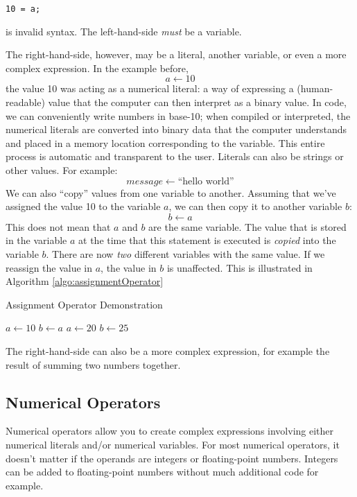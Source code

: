\texttt{10 = a;}

is invalid syntax.  The left-hand-side \emph{must} be a variable.

The right-hand-side, however, may be a \gls{literal}, another variable, or 
even a more complex \gls{expression}.  In the example before, 
  $$a \leftarrow 10$$
the value 10 was acting as a numerical literal: a way of expressing a (human-readable) 
value that the computer can then interpret as a binary value.  In code, we
can conveniently write numbers in base-10; when compiled or interpreted, 
the numerical literals are converted into binary data that the computer
understands and placed in a memory location corresponding to the variable.
This entire process is automatic and transparent to the user.
Literals can also be strings or other values.  For example:
  $$message \leftarrow \text{``hello world''}$$
We can also ``copy'' values from one variable to another.  Assuming that we've assigned
the value 10 to the variable $a$, we can then copy it to another variable $b$: 
  $$b \leftarrow a$$
This does not mean that $a$ and $b$ are the same variable.  The value that is stored
in the variable $a$ at the time that this statement is executed is \emph{copied} into 
the variable $b$.  There are now \emph{two} different variables with the same value.
If we reassign the value in $a$, the value in $b$ is unaffected.  This is illustrated in
Algorithm \ref{algo:assignmentOperator}

\begin{algorithm}[H]
\caption{Assignment Operator Demonstration}
\label{algo:assignmentOperator}
$a \leftarrow 10$ \;
$b \leftarrow a$ \;
$a \leftarrow 20$ \;
$b \leftarrow 25$ \;
\end{algorithm}

The right-hand-side can also be a more complex expression, for example
the result of summing two numbers together.

\subsection{Numerical Operators}

Numerical operators allow you to create complex expressions involving either
numerical literals and/or numerical variables.  For most numerical operators, 
it doesn't matter if the operands are integers or floating-point numbers.  Integers
can be added to floating-point numbers without much additional code for example.

